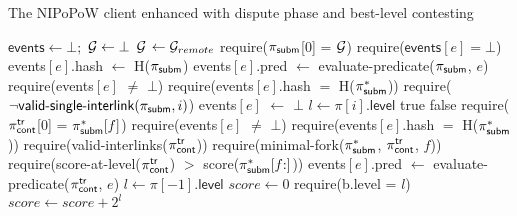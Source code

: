 \begin{algorithm}
    \caption{\label{alg:dispute-best-level}The \textsf{NIPoPoW} client enhanced
        with dispute phase and best-level contesting}

    \begin{algorithmic}[1]

    \State $\textsf{events} \gets \bot;$ $\mathcal{G} \gets \bot$
        \State $\mathcal{G}$ $\gets \mathcal{G}_{remote}$
    \EndFunction
        \State \textsf{require}($\mathsf{\pi_{subm}}$[0] = $\mathcal{G}$)
        \State \textsf{require}($\textsf{events$[e]$} = \bot$)
        \State \textsf{events$[e]$.hash} $\gets$ \textsf{H}($\mathsf{\pi_{subm}}$)
        \State \textsf{events$[e]$.pred} $\gets$
        \textsf{evaluate-predicate}(\textsf{$\mathsf{\pi_{subm}}$}, $e$)
    \EndFunction
        \State \textsf{require}(\textsf{events}$[e]$ $\ne$ $\bot$)
        \State \textsf{require}(\textsf{events$[e]$.hash} $=$ \textsf{H}($\mathsf{\pi_{subm}^*}$))
        \State \textsf{require}($\neg \textsf{valid-single-interlink}(\mathsf{\pi_{subm}}, i)$)
        \State \textsf{events$[e]$} $\gets$ $\bot$
    \EndFunction
        \State $l\gets\pi[i].\mathsf{level}$
        \State \Return true
        \EndIf
        \State \Return false
    \EndFunction
        \State \textsf{require}($\mathsf{\pi_{cont}^{tr}}$[0] = $\mathsf{\pi_{subm}^*}[f]$)
        \State \textsf{require}(\textsf{events}$[e]$ $\ne$ $\bot$)
        \State \textsf{require}(\textsf{events$[e]$.hash} $=$ \textsf{H}($\mathsf{\pi_{subm}^*}$))
        \State \textsf{require}(\textsf{valid-interlinks}($\mathsf{\pi_{cont}^{tr}}$))
        \State \textsf{require}(\textsf{minimal-fork}($\mathsf{\pi_{subm}^*}$,
        $\mathsf{\pi_{cont}^{tr}}$, $f$))
        \State \textsf{require}(\textsf{score-at-level}($\mathsf{\pi_{cont}^{tr}}$)
        $>$ \textsf{score}($\mathsf{\pi_{subm}^*}[f{:}]$))
        \State \textsf{events$[e]$.pred} $\gets$
            \textsf{evaluate-predicate}($\mathsf{\pi_{cont}^{tr}}$, $e$)
    \EndFunction
        \State $l \gets \pi[-1].\textsf{level}$
        \State $score \gets 0$
            \State \textsf{require}(b.\textsf{level} = $l$)
            \State $score \gets score {+} 2^l$
        \EndFor
        \State {}
    \EndFunction
    \EndContract
    \vskip8pt
    \end{algorithmic}
\end{algorithm}

